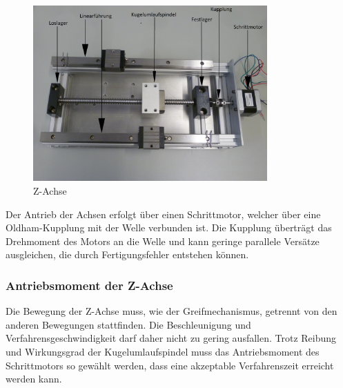 \begin{figure}[htbp] 
  \centering
     \includegraphics[width=0.8\textwidth]{Bilder/Z_Achse.jpg}
			\caption{Z-Achse}
  \label{fig:Bild1}
\end{figure}


Der Antrieb der Achsen erfolgt über einen Schrittmotor, welcher über eine Oldham-Kupplung mit der Welle verbunden ist.
Die Kupplung überträgt das Drehmoment des Motors an die Welle und kann geringe parallele Versätze ausgleichen, die durch Fertigungsfehler entstehen können.\\




\subsubsection{Antriebsmoment der Z-Achse}

Die Bewegung der Z-Achse muss, wie der Greifmechanismus, getrennt von den anderen Bewegungen stattfinden. Die Beschleunigung und Verfahrensgeschwindigkeit darf daher nicht zu gering ausfallen. Trotz Reibung und Wirkungsgrad der Kugelumlaufspindel muss das Antriebsmoment des Schrittmotors so gewählt werden, dass eine akzeptable Verfahrenszeit erreicht werden kann.


